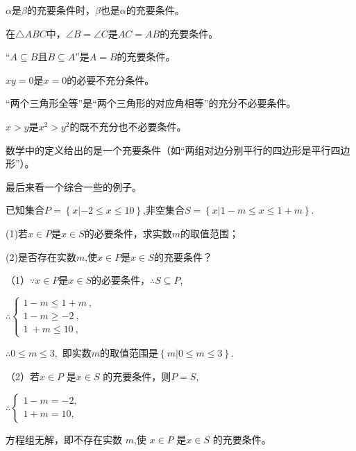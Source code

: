 \documentclass[lang=cn,math=cm,chinesefont=nofont,11pt,scheme=chinese,onecol]{elegantbook}
\begin{document}
\begin{remark}
  $\alpha$是$\beta$的充要条件时，$\beta$也是$\alpha$的充要条件。
\end{remark}

\hspace*{\fill}

\begin{example}
  在$\triangle ABC$中，$\angle B=\angle C$是$AC=AB$的充要条件。
\end{example}

\begin{example}
  “$A\subseteq B$且$B\subseteq A”$是$A=B$的充要条件。
\end{example}

\begin{example}
  $xy=0$是$x=0$的必要不充分条件。
\end{example}

\begin{example}
  “两个三角形全等”是“两个三角形的对应角相等”的充分不必要条件。
\end{example}

\begin{example}
  $x>y$是$x^2>y^2$的既不充分也不必要条件。
\end{example}

\begin{example}
  数学中的定义给出的是一个充要条件（如“两组对边分别平行的四边形是平行四边形”）。
\end{example}

\hspace*{\fill}

最后来看一个综合一些的例子。

\begin{example}\label{2022BST_Math_BX1_RJA_P18.20}
  已知集合$P=\left\{x|-2\leq x\leqslant10\right\}$,非空集合$S=\left\{x|1-m\leqslant x\leqslant1+m\right\}.$

  (1)若$x\in P$是$x\in S$的必要条件，求实数$m$的取值范围；

  (2)是否存在实数$m$,使$x\in P$是$x\in S$的充要条件？
\end{example}

\begin{solution}
  （1）$\because x\in P$是$x\in S$的必要条件，$\therefore S\subseteq P$,

  $\therefore\begin{cases}1-m\leqslant1+m\:,\\1-m\geqslant-2\:,\\1\:+m\leqslant10\:,\end{cases}$
  
  $\therefore 0\leqslant m\leqslant 3,$
  即实数$m$的取值范围是$\left\{m|0\leqslant m\leqslant3\right\}.$

  （2）若$x\in P$ 是$x\in S$ 的充要条件，则$P=S$,

  $\therefore\begin{cases}1-m=-2,\\1+m=10,\end{cases}$
  
  方程组无解，即不存在实数 $m$,使 $x\in P$ 是$x\in S$ 的充要条件。
\end{solution}
\end{document}
